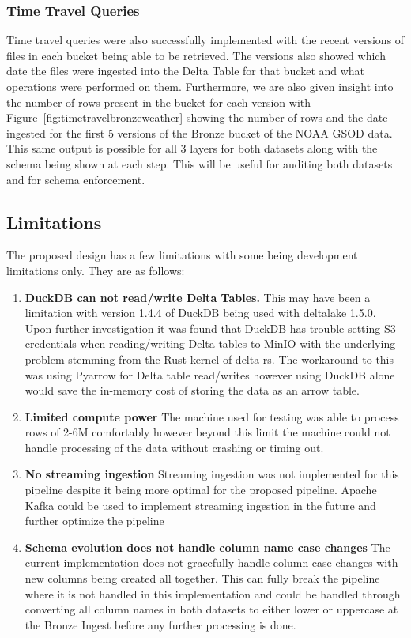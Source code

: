 \documentclass[conference]{IEEEtran}
\begin{document}
\subsubsection{Time Travel Queries}
Time travel queries were also successfully implemented with the recent versions of files in each bucket being able to be retrieved. The versions also showed which date the files were ingested into the Delta Table for that bucket and what operations were performed on them. Furthermore, we are also given insight into the number of rows present in the bucket for each version with Figure~\ref{fig:timetravelbronzeweather} showing the number of rows and the date ingested for the first 5 versions of the Bronze bucket of the NOAA GSOD data. This same output is possible for all 3 layers for both datasets along with the schema being shown at each step. This will be useful for auditing both datasets and for schema enforcement.

\subsection{Limitations}
The proposed design has a few limitations with some being development limitations only. They are as follows:
\begin{enumerate}
    \item \textbf{DuckDB can not read/write Delta Tables.} This may have been a limitation with version 1.4.4 of DuckDB being used with deltalake 1.5.0. Upon further investigation it was found that DuckDB has trouble setting S3 credentials when reading/writing Delta tables to MinIO with the underlying problem stemming from the Rust kernel of delta-rs. The workaround to this was using Pyarrow for Delta table read/writes however using DuckDB alone would save the in-memory cost of storing the data as an arrow table.
    \item \textbf{Limited compute power} The machine used for testing was able to process rows of 2-6M comfortably however beyond this limit the machine could not handle processing of the data without crashing or timing out.
    \item \textbf{No streaming ingestion} Streaming ingestion was not implemented for this pipeline despite it being more optimal for the proposed pipeline. Apache Kafka could be used to implement streaming ingestion in the future and further optimize the pipeline
    \item \textbf{Schema evolution does not handle column name case changes} The current implementation does not gracefully handle column case changes with new columns being created all together. This can fully break the pipeline where it is not handled in this implementation and could be handled through converting all column names in both datasets to either lower or uppercase at the Bronze Ingest before any further processing is done.
\end{enumerate}
\end{document}
